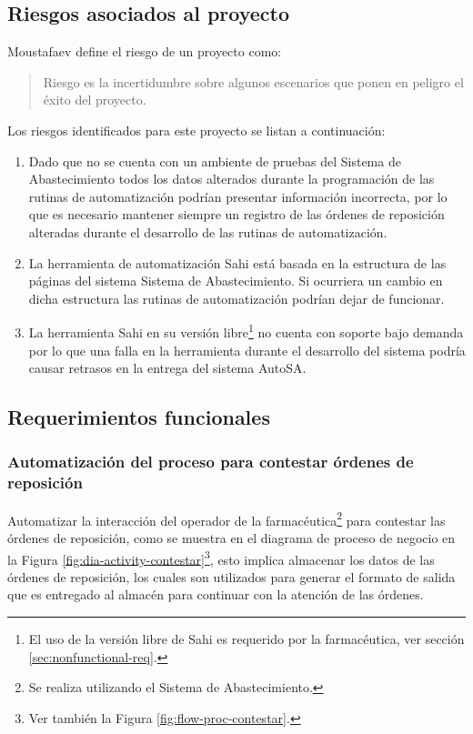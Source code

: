 \subsection{Riesgos asociados al proyecto}\label{sec:riesgos}
Moustafaev\cite{ScopeManagement} define el riesgo de un proyecto como:
\begin{quote}
Riesgo es la incertidumbre sobre algunos escenarios que ponen en peligro el éxito del proyecto.
\end{quote}
Los riesgos identificados para este proyecto se listan a continuación:
\begin{enumerate}
  \item Dado que no se cuenta con un ambiente de pruebas del Sistema de Abastecimiento todos los datos alterados durante la programación de las rutinas de automatización podrían presentar información incorrecta, por lo que es necesario mantener siempre un registro de las órdenes de reposición alteradas durante el desarrollo de las rutinas de automatización.
  \item La herramienta de automatización Sahi está basada en la estructura de las páginas del sistema Sistema de Abastecimiento. Si ocurriera un cambio en dicha estructura las rutinas de automatización podrían dejar de funcionar.
  \item La herramienta Sahi en su versión libre\footnote{El uso de la versión libre de Sahi es requerido por la farmacéutica, ver sección \ref{sec:nonfunctional-req}.} no cuenta con soporte bajo demanda por lo que una falla en la herramienta durante el desarrollo del sistema podría causar retrasos en la entrega del sistema AutoSA.
\end{enumerate}


\subsection{Requerimientos funcionales}\label{sec:req-fun}
\subsubsection{Automatización del proceso para contestar órdenes de reposición}\label{sec:req-contestar}
Automatizar la interacción del operador de la farmacéutica\footnote{Se realiza utilizando el Sistema de Abastecimiento.} para contestar las órdenes de reposición, como se muestra en el diagrama de proceso de negocio en la Figura \ref{fig:dia-activity-contestar}\footnote{Ver también la Figura \ref{fig:flow-proc-contestar}.}, esto implica almacenar los datos de las órdenes de reposición, los cuales son utilizados para generar el formato de salida que es entregado al almacén para continuar con la atención de las órdenes.

